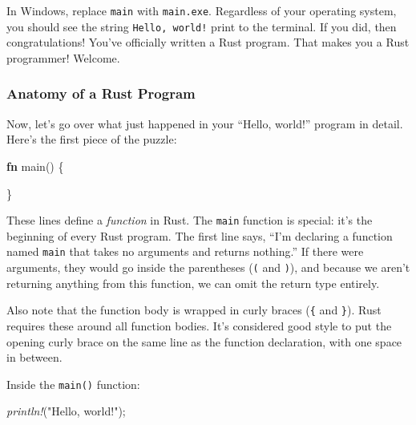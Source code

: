 \documentclass[a4paper,]{book}
\newenvironment{Shaded}{\begin{snugshade}}{\end{snugshade}}
\newcommand{\KeywordTok}[1]{\textcolor[rgb]{0.13,0.29,0.53}{\textbf{{#1}}}}
\newcommand{\StringTok}[1]{\textcolor[rgb]{0.31,0.60,0.02}{{#1}}}
\newcommand{\PreprocessorTok}[1]{\textcolor[rgb]{0.56,0.35,0.01}{\textit{{#1}}}}
\newcommand{\NormalTok}[1]{{#1}}
\begin{document}
\begin{Shaded}
\end{Shaded}

In Windows, replace \texttt{main} with \texttt{main.exe}. Regardless of
your operating system, you should see the string \texttt{Hello,\ world!}
print to the terminal. If you did, then congratulations! You've
officially written a Rust program. That makes you a Rust programmer!
Welcome.

\subsubsection{Anatomy of a Rust
Program}\label{anatomy-of-a-rust-program}

Now, let's go over what just happened in your ``Hello, world!'' program
in detail. Here's the first piece of the puzzle:

\begin{Shaded}
\begin{Highlighting}[]
\KeywordTok{fn} \NormalTok{main() \{}

\NormalTok{\}}
\end{Highlighting}
\end{Shaded}

These lines define a \emph{function} in Rust. The \texttt{main} function
is special: it's the beginning of every Rust program. The first line
says, ``I'm declaring a function named \texttt{main} that takes no
arguments and returns nothing.'' If there were arguments, they would go
inside the parentheses (\texttt{(} and \texttt{)}), and because we
aren't returning anything from this function, we can omit the return
type entirely.

Also note that the function body is wrapped in curly braces (\texttt{\{}
and \texttt{\}}). Rust requires these around all function bodies. It's
considered good style to put the opening curly brace on the same line as
the function declaration, with one space in between.

Inside the \texttt{main()} function:

\begin{Shaded}
\begin{Highlighting}[]
    \PreprocessorTok{println!}\NormalTok{(}\StringTok{"Hello, world!"}\NormalTok{);}
\end{Highlighting}
\end{Shaded}
\end{document}
